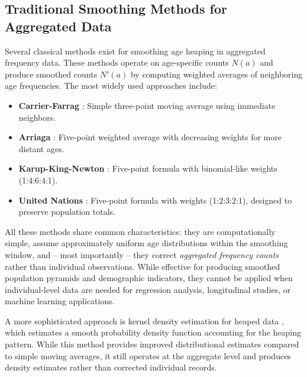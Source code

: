 \documentclass[pdflatex,sn-mathphys-num]{sn-jnl}%
\theoremstyle{thmstyleone}%
\theoremstyle{thmstyletwo}%
\theoremstyle{thmstylethree}%
\begin{document}



\subsection{Traditional Smoothing Methods for Aggregated Data}

Several classical methods exist for smoothing age heaping in aggregated frequency data. These methods operate on age-specific counts $N(a)$ and produce smoothed counts $N'(a)$ by computing weighted averages of neighboring age frequencies. The most widely used approaches include:

\begin{itemize}
    \item \textbf{Carrier-Farrag} \citep{carrier1959}: Simple three-point moving average using immediate neighbors.
    \item \textbf{Arriaga} \citep{arriaga1968}: Five-point weighted average with decreasing weights for more distant ages.
    \item \textbf{Karup-King-Newton} \citep{karup1903}: Five-point formula with binomial-like weights (1:4:6:4:1).
    \item \textbf{United Nations} \citep{un1956}: Five-point formula with weights (1:2:3:2:1), designed to preserve population totals.
\end{itemize}

All these methods share common characteristics: they are computationally simple, assume approximately uniform age distributions within the smoothing window, and -- most importantly -- they correct \emph{aggregated frequency counts} rather than individual observations. While effective for producing smoothed population pyramids and demographic indicators, they cannot be applied when individual-level data are needed for regression analysis, longitudinal studies, or machine learning applications.

A more sophisticated approach is kernel density estimation for heaped data \citep{kernelheaping}, which estimates a smooth probability density function accounting for the heaping pattern. While this method provides improved distributional estimates compared to simple moving averages, it still operates at the aggregate level and produces density estimates rather than corrected individual records.
\end{document}
